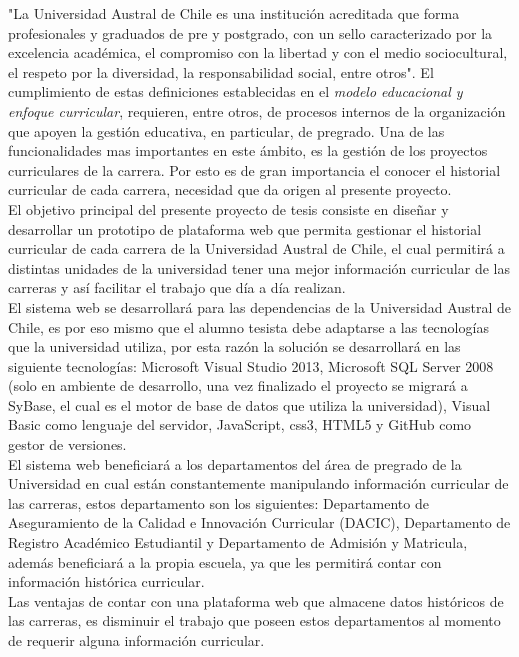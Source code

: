 
			"La Universidad Austral de Chile es una institución acreditada que forma profesionales y graduados de pre 
			y postgrado, con un sello caracterizado por la excelencia académica, el compromiso con la libertad y con 
			el medio sociocultural, el respeto por la diversidad, la responsabilidad social, entre otros"\cite{MOD07}. 
			El cumplimiento de estas definiciones establecidas en el \textit{ modelo educacional y enfoque curricular}, requieren, entre otros, de procesos internos de la organización que apoyen la gestión educativa, en particular, de pregrado. Una de las funcionalidades mas importantes en este ámbito, es la gestión de los proyectos curriculares de la carrera. Por esto es de gran importancia el conocer el historial curricular de cada carrera, necesidad que da origen al presente proyecto.
			\\
			
			El objetivo principal del presente proyecto de tesis consiste en diseñar y desarrollar un prototipo de 
			plataforma web que permita gestionar el historial curricular de cada carrera de la Universidad Austral 
			de Chile, el cual permitirá a distintas unidades de la universidad tener una mejor información curricular 
			de las carreras y así facilitar el trabajo que día a día realizan.
			\\

			
			El sistema web se desarrollará para las dependencias de la Universidad Austral de Chile, es por eso mismo que
			el alumno tesista debe adaptarse a las tecnologías que la universidad utiliza, por esta razón la solución se 
			desarrollará en las siguiente tecnologías: Microsoft Visual Studio 2013, Microsoft SQL Server 2008 
			(solo en ambiente de desarrollo, una vez finalizado el proyecto se migrará a SyBase, el cual es el motor 
			de base de datos que utiliza la universidad), Visual Basic como lenguaje del servidor, JavaScript, css3, HTML5 
			y GitHub como gestor de versiones.
			\\

			
			El sistema web beneficiará a los departamentos del área de pregrado de la Universidad en cual están 
			constantemente manipulando información curricular de las carreras, estos departamento son los siguientes: 
			Departamento de Aseguramiento de la Calidad e Innovación Curricular (DACIC), Departamento de Registro 
			Académico Estudiantil y  Departamento de Admisión y Matricula, además beneficiará a la propia escuela, ya que les permitirá contar con
			información histórica curricular.
			\\
			
			Las ventajas de contar con una plataforma web que almacene datos históricos de las carreras, es disminuir el 
			trabajo que poseen estos departamentos al momento de requerir alguna información curricular.

			